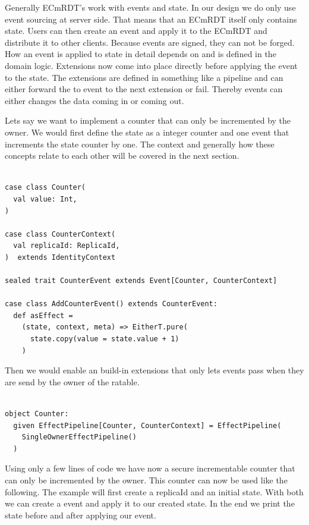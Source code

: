 \documentclass[
	ngerman,
	ruledheaders=section,   %
	class=report,		    %
	thesis={type=bachelor}, %
	accentcolor=9c,			%
	custommargins=true,    %
	marginpar=false,        %
	parskip=half-,          %
	fontsize=11pt,          %
]{tudapub}
\begin{document}
Generally ECmRDT's work with events and state. In our design we do only use event sourcing at server side. That means that an ECmRDT itself only contains state. Users can then create an event and apply it to the ECmRDT and distribute it to other clients. Because events are signed, they can not be forged. How an event is applied to state in detail depends on and is defined in the domain logic. Extensions now come into place directly before applying the event to the state. The extensions are defined in something like a pipeline and can either forward the to event to the next extension or fail. Thereby events can either changes the data coming in or coming out.

Lets say we want to implement a counter that can only be incremented by the owner. We would first define the state as a integer counter and one event that increments the state counter by one. The context and generally how these concepts relate to each other will be covered in the next section.

\begin{lstlisting}
    
case class Counter(
  val value: Int,
) 

case class CounterContext(
  val replicaId: ReplicaId,
)  extends IdentityContext

sealed trait CounterEvent extends Event[Counter, CounterContext]

case class AddCounterEvent() extends CounterEvent:
  def asEffect =
    (state, context, meta) => EitherT.pure(
      state.copy(value = state.value + 1)
    )

\end{lstlisting}

Then we would enable an build-in extensions that only lets events pass when they are send by the owner of the ratable.

\begin{lstlisting}

object Counter:
  given EffectPipeline[Counter, CounterContext] = EffectPipeline(
    SingleOwnerEffectPipeline()
  )

\end{lstlisting}

Using only a few lines of code we have now a secure incrementable counter that can only be incremented by the owner. This counter can now be used like the following. The example will first create a replicaId and an initial state. With both we can create a event and apply it to our created state. In the end we print the state before and after applying our event.
\end{document}

